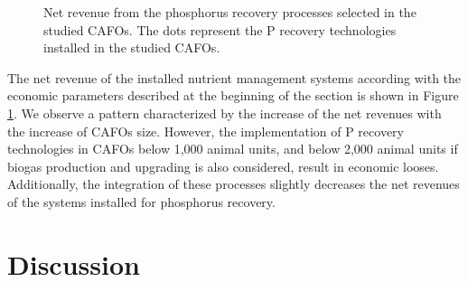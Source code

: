 \begin{refsection}[referencesCh4]
\begin{figure}[h!]
	\caption{Net revenue from the phosphorus recovery processes selected in the studied CAFOs. The dots represent the P recovery technologies installed in the studied CAFOs.}
	\label{fig:NetRev_TechSelected}
\end{figure}

The net revenue of the installed nutrient management systems according with the economic parameters described at the beginning of the section is shown in Figure \ref{fig:NetRev_TechSelected}. We observe a pattern characterized by the increase of the net revenues with the increase of CAFOs size. However, the implementation of P recovery technologies in CAFOs below 1,000 animal units, and below 2,000 animal units if biogas production and upgrading is also considered, result in economic looses. Additionally, the integration of these processes slightly decreases the net revenues of the systems installed for phosphorus recovery.


\section{Discussion}

\end{refsection}
